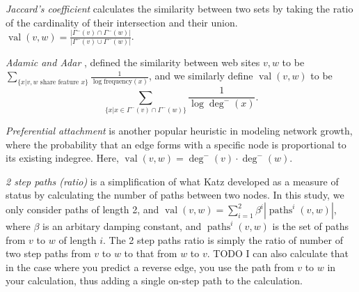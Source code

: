 \documentclass[conference]{IEEEtran}
\begin{document}
\emph{Jaccard's coefficient} calculates the similarity between two sets by taking the ratio of the cardinality of their intersection and their union. $\operatorname{val}(v,w) = \frac{|\Gamma^-(v) \cap \Gamma^-(w)|}{|\Gamma^-(v) \cup \Gamma^-(w)|}$.

\emph{Adamic and Adar} \cite{Adamic:2003ud}, defined the similarity between web sites $v,w$ to be $ \sum_{\{x|v,w \text{ share feature }x\}} \frac{1}{\log{\text{frequency}(x)}} $, and we similarly define $\operatorname{val}(v,w)$ to be \[ \sum_{\{x|x \in \Gamma^-(v) \cap \Gamma^-(w)\}} \frac{1}{\log{\deg^-(x)}} .\]

\emph{Preferential attachment} is another popular heuristic in modeling network growth, where the probability that an edge forms with a specific node is proportional to its existing indegree. Here, $\operatorname{val}(v,w) = \deg^-(v)\cdot \deg^-(w)$.

\emph{2 step paths (ratio)} is a simplification of what Katz \cite{Katz:1953un} developed as a measure of status by calculating the number of paths between two nodes. In this study, we only consider paths of length 2, and $\operatorname{val}(v,w) = \sum_{i=1}^2 \beta^i|\operatorname{paths}^i(v,w)|$, where $\beta$ is an arbitary damping constant, and $\operatorname{paths}^i(v,w)$ is the set of paths from $v$ to $w$ of length $i$. The 2 step paths ratio is simply the ratio of number of two step paths from $v$ to $w$ to that from $w$ to $v$. TODO I can also calculate that in the case where you predict a reverse edge, you use the path from $v$ to $w$ in your calculation, thus adding a single on-step path to the calculation.
\end{document}
